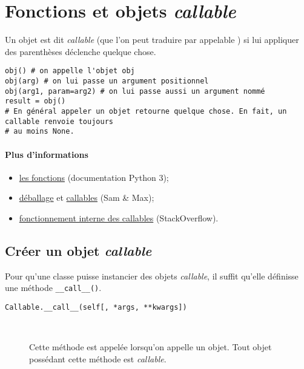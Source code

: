 \section{Fonctions et objets {\normalfont\bfseries\itshape callable}}\label{sec:callable}
Un objet est dit \textit{callable} (que l'on peut traduire par \og appelable \fg{}) si lui appliquer des parenthèses déclenche quelque chose.

\begin{verbatim}
obj() # on appelle l'objet obj
obj(arg) # on lui passe un argument positionnel
obj(arg1, param=arg2) # on lui passe aussi un argument nommé
result = obj() 
# En général appeler un objet retourne quelque chose. En fait, un callable renvoie toujours
# au moins None.
\end{verbatim}

\paragraph*{Plus d'informations}
\begin{itemize}
    \item \href{https://docs.python.org/3/reference/datamodel.html\#index-32}{les fonctions} (documentation Python 3);
    \item \href{http://sametmax.com/quest-ce-que-lunpacking-en-python-et-a-quoi-ca-sert/}{déballage} et \href{http://sametmax.com/quest-ce-quun-callable-en-python/}{callables} (Sam \& Max);
    \item \href{https://stackoverflow.com/a/32856533/9214306}{fonctionnement interne des callables} (StackOverflow).
\end{itemize}

\subsection{Créer un objet {\normalfont\bfseries\itshape callable}}

Pour qu'une classe puisse instancier des objets \emph{callable}, il suffit qu'elle définisse une méthode
\texttt{__call__()}.

\begin{description}
    \item[\texttt{Callable.__call__(self[, *args, **kwargs])}]~
 
    Cette méthode est appelée lorsqu'on appelle un objet. Tout objet possédant cette méthode est \emph{callable}.
\end{description}

